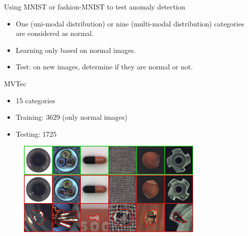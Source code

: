 \documentclass[xcolor=pdftex,dvipsnames,table,mathserif,aspectratio=169]{beamer}
\begin{document}
\begin{frame}{Using MNIST or fashion-MNIST to test anomaly detection}

\begin{itemize}
\item One (uni-modal distribution) or nine (multi-modal distribution) categories are considered as normal.
\item Learning only based on normal images.
\item Test: on new images, determine if they are normal or not.
\end{itemize}

\end{frame}



\begin{frame}{MVTec~\tiny{\cite{bergmann_mvtec_2019}}}

\begin{itemize}
\item 15 categories
\item Training: 3629 (only normal images)
\item Testing: 1725
\end{itemize}

\begin{figure}[ht]
  \centering
  \includegraphics[width=0.8\textwidth]{mvtec}
\end{figure}


\end{frame}
\end{document}
